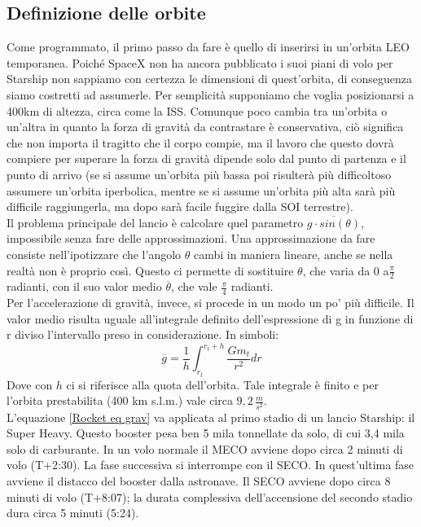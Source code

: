 \subsection{Definizione delle orbite}
\label{Definizione orbite}
Come programmato, il primo passo da fare è quello di inserirsi in un'orbita LEO temporanea. Poiché SpaceX non ha ancora pubblicato i suoi piani di volo per Starship non sappiamo con certezza le dimensioni di quest'orbita, di conseguenza siamo costretti ad assumerle. Per semplicità supponiamo che voglia posizionarsi a 400km di altezza, circa come la ISS. Comunque poco cambia tra un'orbita o un'altra in quanto la forza di gravità da contrastare è conservativa, ciò significa che non importa il tragitto che il corpo compie, ma il lavoro che questo dovrà compiere per superare la forza di gravità dipende solo dal punto di partenza e il punto di arrivo (se si assume  un'orbita più bassa poi risulterà più difficoltoso assumere un'orbita iperbolica, mentre se si assume un'orbita più alta sarà più difficile raggiungerla, ma dopo sarà facile fuggire dalla SOI terrestre).\\
Il problema principale del lancio è calcolare quel parametro $\overline{g \cdot sin(\theta)}$, impossibile senza fare delle approssimazioni. Una approssimazione da fare consiste nell'ipotizzare che l'angolo $\theta$ cambi in maniera lineare, anche se nella realtà non è proprio così. Questo ci permette di sostituire $\theta$, che varia da 0 a$\frac{\pi}{2}$ radianti, con il suo valor medio $\overline{\theta}$, che vale $\frac{\pi}{4}$ radianti. \\
Per l'accelerazione di gravità, invece, si procede in un modo un po' più difficile. Il valor medio risulta uguale all'integrale definito dell'espressione di g in funzione di r diviso l'intervallo preso in considerazione. In simboli:
$$
\overline{g} = \frac{1}{h}\int_{r_t}^{r_t+h}{\frac{Gm_t}{r^2}dr}
$$
Dove con $h$ ci si riferisce alla quota dell'orbita. Tale integrale è finito e per l'orbita prestabilita (400 km s.l.m.) vale circa $9,2 \, \frac{m}{s^2}$.\\
L'equazione \ref{Rocket eq grav} va applicata al primo stadio di un lancio Starship: il Super Heavy. Questo booster pesa ben 5 mila tonnellate da solo, di cui 3,4 mila solo di carburante. In un volo normale il MECO avviene dopo circa 2 minuti di volo (T+2:30). La fase successiva si interrompe con il SECO. In quest'ultima fase avviene il distacco del booster dalla astronave. Il SECO avviene dopo circa 8 minuti di volo (T+8:07); la durata complessiva dell'accensione del secondo stadio dura circa 5 minuti (5:24).
